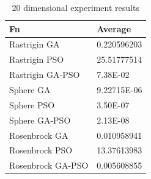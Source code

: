 \documentclass[runningheads]{llncs}
\begin{document}
                  \begin{table}[htp]

                    \caption{20 dimensional experiment results}
                    \label{table:resultados-2}
                    \centering
                    \begin{tabular}{|l|l|}
                    \hline
                    Fn  & Average\\
                    \hline
                    \hline
                    Rastrigin GA & 0.220596203\\
                    \hline
                    Rastrigin PSO & 25.51777514\\
                    \hline
                    Rastrigin GA-PSO & 7.38E-02\\
                    \hline
                    Sphere GA & 9.22715E-06\\
                    \hline
                    Sphere PSO & 3.50E-07\\
                    \hline
                    Sphere GA-PSO & 2.13E-08\\
                    \hline
                    Rosenbrock GA  & 0.010958941\\
                    \hline
                    Rosenbrock PSO & 13.37613983\\
                    \hline
                    Rosenbrock GA-PSO & 0.005608855\\
                    \hline
                    \end{tabular}
                    \end{table}
    


\end{document}
